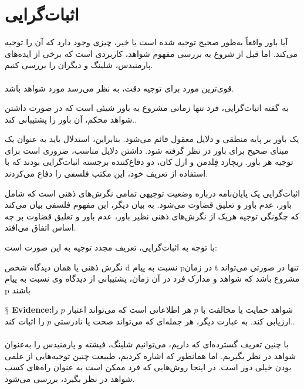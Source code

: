 \documentclass[10pt,a4paper]{article}
\newcommand{\newpoint}[1]{\indent$\mathsection$ \textbf{#1}}
\begin{document}
            \section{اثبات‌گرایی } 
                آیا باور واقعاً به‌طور صحیح توجیه شده است یا خیر، چیزی وجود دارد که آن را توجیه می‌کند. اما قبل از شروع به بررسی مفهوم شواهد، کاربردی است که برخی از ایده‌های پارمنیدس، شلینگ و دیگران را بررسی کنیم.\cite{sep-epistemology}
                \\
                \\
                قوی‌ترین مورد برای توجیه دقت، به نظر می‌رسد مورد شواهد باشد.
                \begin{define}
به گفته اثبات‌گرایی، فرد تنها زمانی مشروع به باور شیئی است که در صورت داشتن شواهد محکم، آن باور را پشتیبانی کند.. \cite{enwiki:1149588226}
                \end{define}
                یک باور بر پایه منطقی و دلایل معقول قائم می‌شود. بنابراین، استدلال باید به عنوان یک مبنای صحیح برای باور در نظر گرفته شود. داشتن دلایل مناسب، ضروری است برای توجیه هر باور. ریچارد فِلدمن و ارل کان، دو دفاع‌کننده برجسته اثبات‌گرایی بودند که با استفاده از تعریف خود، این مکتب فلسفی را دفاع می‌کردند.
                \begin{define}
                    اثبات‌گرایی یک پایان‌نامه درباره وضعیت توجیهی تمامی نگرش‌های ذهنی است که شامل باور، عدم باور و تعلیق قضاوت می‌شود. به بیان دیگر، این مفهوم فلسفی بیان می‌کند که چگونگی توجیه هریک از نگرش‌های ذهنی نظیر باور، عدم باور و تعلیق قضاوت بر چه اساس اتفاق می‌افتد.
                \end{define}
                با توجه به اثبات‌گرایی، تعریف مجدد توجیه به این صورت است:
                \begin{define}
نگرش ذهنی یا همان دیدگاه شخص d نسبت به پیام pدر زمان t تنها در صورتی می‌تواند مشروع باشد که شواهد و مدارک فرد در آن زمان، پشتیبانی از دیدگاه وی نسبت به پیام p باشند
                \end{define}                

\newpoint{Evidence:}شواهد حمایت یا مخالفت با $p$ هر اطلاعاتی است که می‌تواند اعتبار $p$ را ارزیابی کند. به عبارت دیگر، هر جمله‌ای که می‌تواند صحت یا نادرستی $p$ را اثبات کند..\cite{Mittag2015-qc}
                \\
                \\
با چنین تعریف گسترده‌ای که داریم، می‌توانیم شلینگ، فیشته و پارمنیدس را به‌عنوان شواهد در نظر بگیریم. اما همانطور که اشاره کردیم، طبیعت چنین توجیه‌هایی از علمی بودن خیلی دور است. در اینجا روش‌هایی که فرد ممکن است به عنوان راه‌های کسب شواهد در نظر بگیرد، بررسی می‌شود.
                \\
                \\
\end{document}
